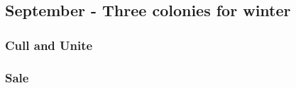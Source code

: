 \subsection{September - Three colonies for winter}

\subsubsection{Cull and Unite}


\subsubsection{Sale}